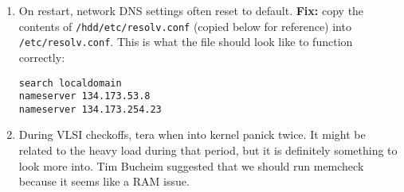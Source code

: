 \begin{enumerate}
\item On restart, network DNS settings often reset to default. \textbf{Fix:} copy the contents of \texttt{/hdd/etc/resolv.conf} (copied below for reference) into \texttt{/etc/resolv.conf}. This is what the file should look like to function correctly:

\begin{verbatim}
search localdomain
nameserver 134.173.53.8
nameserver 134.173.254.23
\end{verbatim}

\item During VLSI checkoffs, tera when into kernel panick twice. It might be related to the heavy load during that period, but it is definitely something to look more into. Tim Bucheim suggested that we should run memcheck because it seems like a RAM issue.
\end{enumerate}

